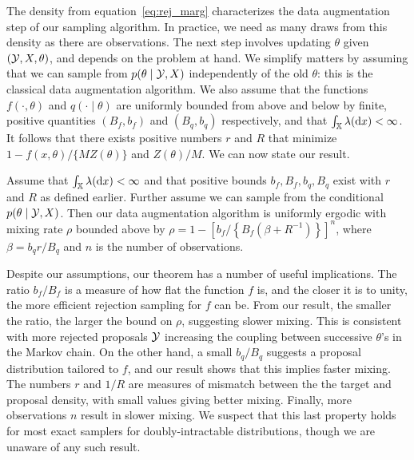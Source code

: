 The density from equation~\eqref{eq:rej_marg} characterizes the data augmentation step of our sampling algorithm. In practice, we need as many draws from this density as there are observations. 
The next step involves updating $\theta$ given $(\mathcal{Y}, X,\theta)$, and depends on the problem at hand.
We simplify matters by assuming that we can 
sample from $p({\theta}\mid\mathcal{Y}, X)$ independently of the old $\theta$: this is the classical data augmentation algorithm. We also assume that 
the functions $f(\cdot,\theta)$ and $q(\cdot\mid\theta)$ are uniformly bounded from above and below by finite, positive quantities $(B_f, b_f)$ and 
$(B_q, b_q)$ respectively, and that $\int_{\mathbb{X}} \lambda(\mathrm{d}x) < \infty$.
It follows that there exists positive numbers $r$ and $R$ that minimize $1-{f(x,\theta)}/{\{MZ(\theta)\}}$ and ${Z(\theta)}/{M}$.
We can now state our result.
\begin{theorem}
  Assume that $\int_{\mathbb{X}} \lambda(\mathrm{d}x) < \infty$ and that positive bounds $b_f, B_f, b_q, B_q$ exist with $r$ and $R$ as defined
  earlier. %
Further assume we can sample from the conditional 
$p({\theta}\mid\mathcal{Y}, X)$. Then our data augmentation algorithm is uniformly ergodic with mixing rate $\rho$ bounded above by
$ \rho = 1-\left[{b_f}/\left\{B_f\left( \beta + R^{-1}\right)\right\}\right]^n$, 
where $\beta = b_qr/B_q$ and $n$ is the number of observations.  \label{thrm:conv_rate}
\end{theorem}  
Despite our assumptions, our theorem has a number of useful implications. The ratio $b_f/B_f$ is a measure of how flat the function $f$ is,
and the closer it is to unity, the more efficient rejection sampling for $f$ can be. From our result, the smaller the ratio, the larger the bound on $\rho$,
suggesting slower mixing. This is consistent with more rejected proposals $\mathcal{Y}$ increasing the coupling between successive $\theta$'s in the 
Markov chain.
On the other hand, a small $b_q/B_q$ suggests a proposal distribution tailored to $f$, and our result shows that this implies faster mixing.
The numbers $r$ and $1/R$ are measures of mismatch between the the target and proposal density, with small values giving better mixing.
Finally, more observations $n$ result in slower mixing. 
We suspect that this last property holds for most exact samplers
for doubly-intractable distributions, though we are unaware of any such result.

